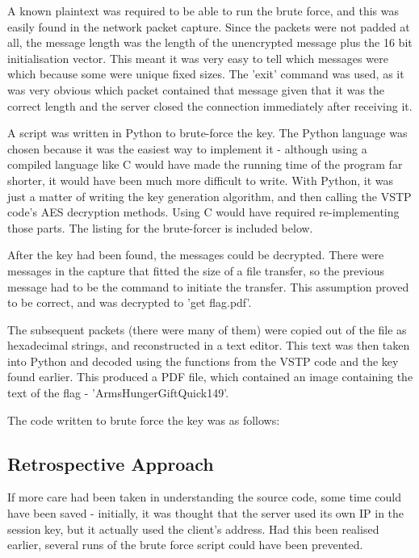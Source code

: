 A known plaintext was required to be able to run the brute force, and this
was easily found in the network packet capture. Since the packets were not
padded at all, the message length was the length of the unencrypted message
plus the 16 bit initialisation vector. This meant it was very easy to tell
which messages were which because some were unique fixed sizes. The 'exit'
command was used, as it was very obvious which packet contained that message
given that it was the correct length and the server closed the connection
immediately after receiving it.

A script was written in Python to brute-force the key. The Python language
was chosen because it was the easiest way to implement it - although using a
compiled language like C would have made the running time of the program far
shorter, it would have been much more difficult to write. With Python, it was
just a matter of writing the key generation algorithm, and then calling the
VSTP code's AES decryption methods. Using C would have required 
re-implementing those parts. The listing for the brute-forcer is included
below.

After the key had been found, the messages could be decrypted. There were
messages in the capture that fitted the size of a file transfer, so the
previous message had to be the command to initiate the transfer. This
assumption proved to be correct, and was decrypted to 'get flag.pdf'.

The subsequent packets (there were many of them) were copied out of the file
as hexadecimal strings, and reconstructed in a text editor. This text was then
taken into Python and decoded using the functions from the VSTP code and the
key found earlier. This produced a PDF file, which contained an image containing
the text of the flag - 'ArmsHungerGiftQuick149'.

The code written to brute force the key was as follows:


\subsection{Retrospective Approach}
If more care had been taken in understanding the source code, some time could
have been saved - initially, it was thought that the server used its own IP
in the session key, but it actually used the client's address. Had this been
realised earlier, several runs of the brute force script could have been
prevented.

